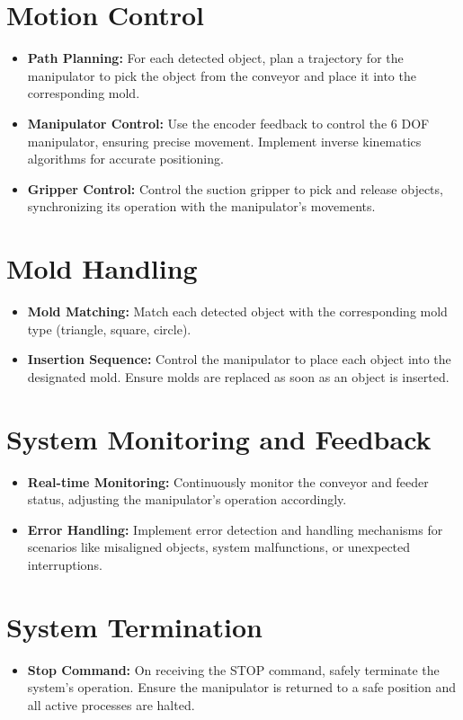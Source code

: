 \documentclass[12pt]{report}
\begin{document}
\section{Motion Control}
\begin{itemize}
    \item \textbf{Path Planning:} For each detected object, plan a trajectory for the manipulator to pick the object from the conveyor and place it into the corresponding mold.
    \item \textbf{Manipulator Control:} Use the encoder feedback to control the 6 DOF manipulator, ensuring precise movement. Implement inverse kinematics algorithms for accurate positioning.
    \item \textbf{Gripper Control:} Control the suction gripper to pick and release objects, synchronizing its operation with the manipulator's movements.
\end{itemize}

\section{Mold Handling}
\begin{itemize}
    \item \textbf{Mold Matching:} Match each detected object with the corresponding mold type (triangle, square, circle).
    \item \textbf{Insertion Sequence:} Control the manipulator to place each object into the designated mold. Ensure molds are replaced as soon as an object is inserted.
\end{itemize}

\section{System Monitoring and Feedback}
\begin{itemize}
    \item \textbf{Real-time Monitoring:} Continuously monitor the conveyor and feeder status, adjusting the manipulator's operation accordingly.
    \item \textbf{Error Handling:} Implement error detection and handling mechanisms for scenarios like misaligned objects, system malfunctions, or unexpected interruptions.
\end{itemize}

\section{System Termination}
\begin{itemize}
    \item \textbf{Stop Command:} On receiving the STOP command, safely terminate the system's operation. Ensure the manipulator is returned to a safe position and all active processes are halted.
\end{itemize}
\end{document}
